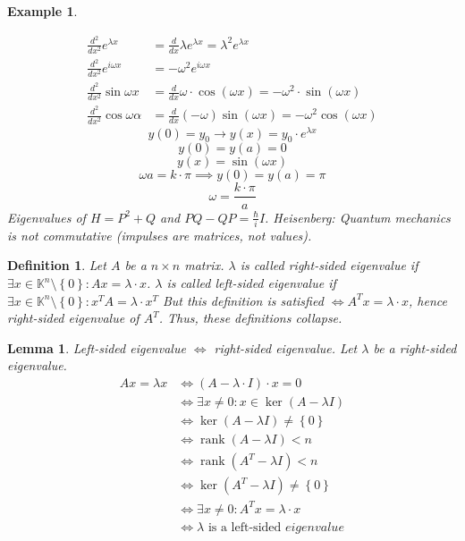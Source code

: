 \documentclass{article}
\newcounter{lecref}[section]
\numberwithin{lecref}{section}
\newtheorem{example}[lecref]{Example}
\newtheorem{definition}[lecref]{Definition}
\newtheorem{lemma}[lecref]{Lemma}
\newcommand{\set}[1]{\left\{#1\right\}}
\DeclareMathOperator{\rank}{rank}
\begin{document}
\begin{example}
\begin{enumerate}
\begin{align*}
        \frac{d^2}{dx^2} e^{\lambda x} &= \frac{d}{dx} \lambda e^{\lambda x} = \lambda^2 e^{\lambda x} \\
        \frac{d^2}{dx^2} e^{i \omega x} &= -\omega^2 e^{i\omega x} \\
        \frac{d^2}{dx^2} \sin{\omega x} &= \frac{d}{dx} \omega \cdot \cos(\omega x) = -\omega^2 \cdot \sin(\omega x) \\
        \frac{d^2}{dx^2} \cos{\omega \alpha} &= \frac{d}{dx} (-\omega) \sin(\omega x) = -\omega^2 \cos(\omega x)
      \end{align*}
      \[ y(0) = y_0 \to y(x) = y_0 \cdot e^{\lambda x} \]
      \[ y(0) = y(a) = 0 \]
      \[ y(x) = \sin(\omega x) \]
      \[ \omega a = k \cdot \pi \implies y(0) = y(a) = \pi \]
      \[ \omega = \frac{k \cdot \pi}{a} \]
      Eigenvalues of $H = P^2 + Q$ and $PQ - QP = \frac{\hbar}{i} I$. Heisenberg: Quantum mechanics is not commutative (impulses are matrices, not values).
  \end{enumerate}
\end{example}

\begin{definition} %
  Let $A$ be a $n \times n$ matrix.
  $\lambda$ is called right-sided eigenvalue if $\exists x \in \mathbb K^n \setminus \set{0}: Ax = \lambda \cdot x$.
  $\lambda$ is called left-sided eigenvalue if $\exists x \in \mathbb K^n \setminus \set{0}: x^T A = \lambda \cdot x^T$
  But this definition is satisfied $\iff A^T x = \lambda \cdot x$, hence right-sided eigenvalue of $A^T$.
  Thus, these definitions collapse.
\end{definition}

\begin{lemma} %
  Left-sided eigenvalue $\iff$ right-sided eigenvalue.
  Let $\lambda$ be a right-sided eigenvalue.
  \begin{align*}
    Ax = \lambda x &\iff (A - \lambda \cdot I) \cdot x = 0 \\
      &\iff \exists x \neq 0: x \in \ker(A - \lambda I) \\
      &\iff \ker(A - \lambda I) \neq \set{0} \\
      &\iff \rank(A - \lambda I) < n \\
      &\iff \rank(A^T - \lambda I) < n \\
      &\iff \ker(A^T - \lambda I) \neq \set{0} \\
      &\iff \exists x \neq 0: A^T x = \lambda \cdot x \\
      &\iff \lambda \text{ is a left-sided } eigenvalue
  \end{align*}
\end{lemma}
\end{document}
